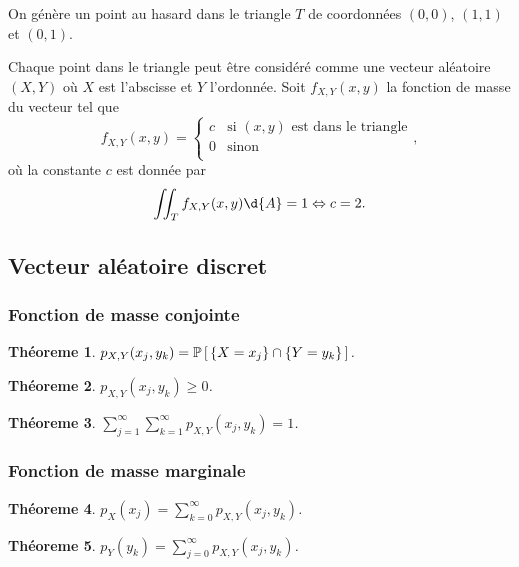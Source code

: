 \documentclass[11pt]{article}
\renewcommand\P[1]{%
	\ensuremath{%
		\mathbb{P}\left[\,#1\,\right]%
	}%
}%
\newtheorem{theoreme}{Théoreme}[section]
\begin{document}
\pagebreak
\begin{exemple}
	On génère un point au hasard dans le triangle $T$ de coordonnées $(0,0)$,
	$(1,1)$ et $(0,1)$.

	Chaque point dans le triangle peut être considéré comme une vecteur
	aléatoire $(X,Y)$ où $X$ est l'abscisse et $Y$ l'ordonnée. Soit
	$f_{X,Y}(x,y)$ la fonction de masse du vecteur tel que
	\begin{equation*}
		f_{X,Y}(x,y)=\left\{
			\begin{array}{rl}
				c&\text{si $(x,y)$ est dans le triangle}\\
				0&\text{sinon}\\
			\end{array}
		\right.,
	\end{equation*}
	où la constante $c$ est donnée par
	\begin{equation*}
		\iint_Tf_{X,Y}(x,y)\d{A}=1\Leftrightarrow c=2.
	\end{equation*}
\end{exemple}

\subsection{Vecteur aléatoire discret}
\subsubsection{Fonction de masse conjointe}
\begin{theoreme}
	$p_{X,Y}(x_j,y_k)=\P{\left\{X=x_j\right\}\cap\left\{Y=y_k\right\}}$.
\end{theoreme}

\begin{theoreme}
	$p_{X,Y}(x_j,y_k)\geq 0$.
\end{theoreme}

\begin{theoreme}
	$\displaystyle\sum_{j=1}^\infty\displaystyle\sum_{k=1}^\infty
	p_{X,Y}(x_j,y_k)=1$.
\end{theoreme}

\subsubsection{Fonction de masse marginale}
\begin{theoreme}
	$p_X(x_j)=\displaystyle\sum_{k=0}^\infty p_{X,Y}(x_j,y_k)$.
\end{theoreme}

\begin{theoreme}
	$p_Y(y_k)=\displaystyle\sum_{j=0}^\infty p_{X,Y}(x_j,y_k)$.
\end{theoreme}
\end{document}
